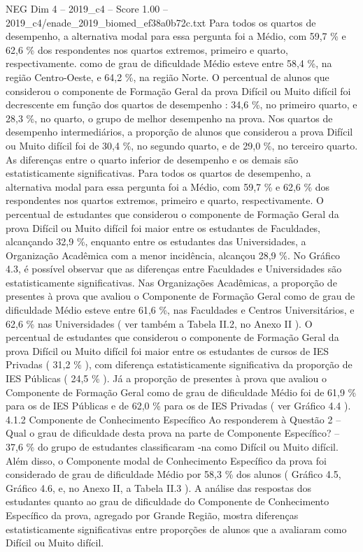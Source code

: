 \begin{textsample}{NEG Dim 4 – 2019\_c4 – Score 1.00 – 2019\_c4/enade\_2019\_biomed\_ef38a0b72c.txt}
Para todos os quartos de desempenho, a alternativa modal para essa pergunta foi a Médio, com 59,7 \% e 62,6 \% dos respondentes nos quartos extremos, primeiro e quarto, respectivamente. como de grau de dificuldade Médio esteve entre 58,4 \%, na região Centro-Oeste, e 64,2 \%, na região Norte.
O percentual de alunos que considerou o componente de Formação Geral da prova Difícil ou Muito difícil foi decrescente em função dos quartos de desempenho : 34,6 \%, no primeiro quarto, e 28,3 \%, no quarto, o grupo de melhor desempenho na prova.
Nos quartos de desempenho intermediários, a proporção de alunos que considerou a prova Difícil ou Muito difícil foi de 30,4 \%, no segundo quarto, e de 29,0 \%, no terceiro quarto.
As diferenças entre o quarto inferior de desempenho e os demais são estatisticamente significativas.
Para todos os quartos de desempenho, a alternativa modal para essa pergunta foi a Médio, com 59,7 \% e 62,6 \% dos respondentes nos quartos extremos, primeiro e quarto, respectivamente.
O percentual de estudantes que considerou o componente de Formação Geral da prova Difícil ou Muito difícil foi maior entre os estudantes de Faculdades, alcançando 32,9 \%, enquanto entre os estudantes das Universidades, a Organização Acadêmica com a menor incidência, alcançou 28,9 \%.
No Gráfico 4.3, é possível observar que as diferenças entre Faculdades e Universidades são estatisticamente significativas.
Nas Organizações Acadêmicas, a proporção de presentes à prova que avaliou o Componente de Formação Geral como de grau de dificuldade Médio esteve entre 61,6 \%, nas Faculdades e Centros Universitários, e 62,6 \% nas Universidades ( ver também a Tabela II.2, no Anexo II ).
O percentual de estudantes que considerou o componente de Formação Geral da prova Difícil ou Muito difícil foi maior entre os estudantes de cursos de IES Privadas ( 31,2 \% ), com diferença estatisticamente significativa da proporção de IES Públicas ( 24,5 \% ).
Já a proporção de presentes à prova que avaliou o Componente de Formação Geral como de grau de dificuldade Médio foi de 61,9 \% para os de IES Públicas e de 62,0 \% para os de IES Privadas ( ver Gráfico 4.4 ). 4.1.2 Componente de Conhecimento Específico Ao responderem à Questão 2 – Qual o grau de dificuldade desta prova na parte de Componente Específico? – 37,6 \% do grupo de estudantes classificaram -na como Difícil ou Muito difícil.
Além disso, o Componente modal de Conhecimento Específico da prova foi considerado de grau de dificuldade Médio por 58,3 \% dos alunos ( Gráfico 4.5, Gráfico 4.6, e, no Anexo II, a Tabela II.3 ).
A análise das respostas dos estudantes quanto ao grau de dificuldade do Componente de Conhecimento Específico da prova, agregado por Grande Região, mostra diferenças estatisticamente significativas entre proporções de alunos que a avaliaram como Difícil ou Muito difícil.

\end{textsample}

